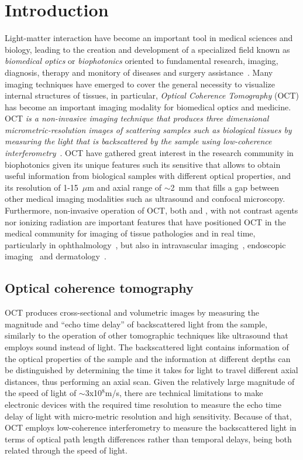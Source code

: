 \newpage
{}
\chapter{Introduction}

Light-matter interaction have become an important tool in medical sciences and biology, leading to the creation and development of a specialized field known as \textit{biomedical optics} or \textit{biophotonics} oriented to fundamental research, imaging, diagnosis, therapy and monitory of diseases and surgery assistance~\cite{}. Many imaging techniques have emerged to cover the general necessity to visualize internal structures of tissues, in particular, \textit{Optical Coherence Tomography} (OCT) has become an important imaging modality for biomedical optics and medicine. OCT \textit{is a non-invasive imaging technique that produces three dimensional micrometric-resolution images of scattering samples such as biological tissues by measuring the light that is backscattered by the sample using low-coherence interferometry}~\cite{}. OCT have gathered great interest in the research community in biophotonics given its unique features such its sensitive that allows to obtain useful information from biological samples with different optical properties, and its resolution of 1-15~$\mu$m and axial range of $\sim$2~mm that fills a gap between other medical imaging modalities such as ultrasound and confocal microscopy. Furthermore, non-invasive operation of OCT, both \exvi and \invi, with not contrast agents nor ionizing radiation are important features that have positioned OCT in the medical community for imaging of tissue pathologies \insi and in real time, particularly in ophthalmology~\cite{}, but also in intravascular imaging~\cite{}, endoscopic imaging~\cite{} and dermatology~\cite{}. 

\section{Optical coherence tomography}
OCT produces cross-sectional and volumetric images by measuring the magnitude and ``echo time delay'' of backscattered light from the sample, similarly to the operation of other tomographic techniques like ultrasound that employs sound instead of light. The backscattered light contains information of the optical properties of the sample and the information at different depths can be distinguished by determining the time it takes for light to travel different axial distances, thus performing an axial scan. Given the relatively large magnitude of the speed of light of $\sim$3x10$^8$m/s, there are technical limitations to make electronic devices with the required time resolution to measure the echo time delay of light with micro-metric resolution and high sensitivity. Because of that, OCT employs low-coherence interferometry to measure the backscattered light in terms of optical path length differences rather than temporal delays, being both related through the speed of light.

